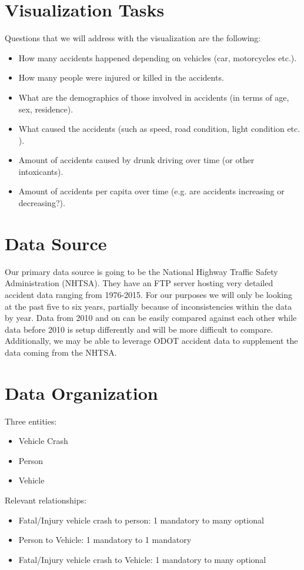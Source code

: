 \documentclass[journal]{vgtc}                %
\begin{document}
\section{Visualization Tasks}

Questions that we will address with the visualization are the following:
\begin{itemize}
  \item How many accidents happened depending on vehicles (car, motorcycles etc.).
  \item How many people were injured or killed in the accidents.
  \item What are the demographics of those involved in accidents (in terms of age, sex, residence).
  \item What caused the accidents (such as speed, road condition, light condition etc. ).
  \item Amount of accidents caused by drunk driving over time (or other intoxicants).
  \item Amount of accidents per capita over time (e.g. are accidents increasing or decreasing?).
\end{itemize}

\section{Data Source}
Our primary data source is going to be the National Highway Traffic Safety Administration (NHTSA). 
They have an FTP server hosting very detailed accident data ranging from 1976-2015. 
For our purposes we will only be looking at the past five to six years, partially because of inconsistencies within the data by year. 
Data from 2010 and on can be easily compared against each other while data before 2010 is setup differently and will be more difficult to compare. 
Additionally, we may be able to leverage ODOT accident data to supplement the data coming from the NHTSA.

\section{Data Organization}
Three entities:
\begin{itemize}
  \item Vehicle Crash
  \item Person 
  \item Vehicle
\end{itemize}

Relevant relationships:
\begin{itemize}
  \item Fatal/Injury vehicle crash to person: 1 mandatory to many optional
  \item Person to Vehicle: 1 mandatory to 1 mandatory
  \item Fatal/Injury vehicle crash to Vehicle: 1 mandatory to many optional
\end{itemize}
\end{document}
